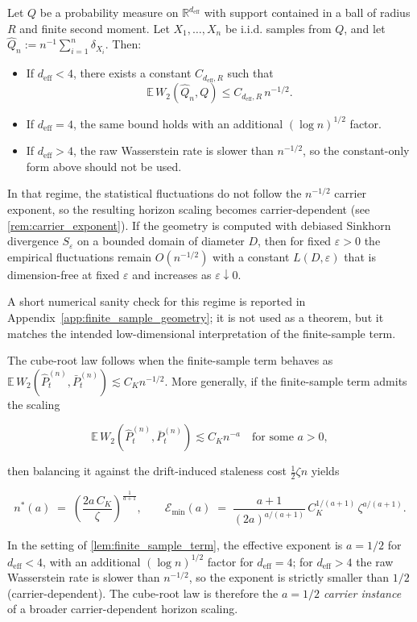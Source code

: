 \begin{lemma}\label{lem:finite_sample_term}
Let $Q$ be a probability measure on $\mathbb R^{d_\mathrm{eff}}$ with support
contained in a ball of radius $R$ and finite second moment. Let
$X_1,\dots,X_n$ be i.i.d. samples from $Q$, and let
$\hat Q_n := n^{-1}\sum_{i=1}^n \delta_{X_i}$. Then:
\begin{itemize}
  \item If $d_\mathrm{eff}<4$, there exists a constant $C_{d_\mathrm{eff},R}$
  such that
  \[
    \mathbb E\,W_2(\hat Q_n,Q) \le C_{d_\mathrm{eff},R}\,n^{-1/2}.
  \]
  \item If $d_\mathrm{eff}=4$, the same bound holds with an additional
  $(\log n)^{1/2}$ factor.
	\item If $d_\mathrm{eff}>4$, the raw Wasserstein rate is slower than
	$n^{-1/2}$, so the constant-only form above should not be used.
	\end{itemize}

	In that regime, the statistical fluctuations do not follow the
	$n^{-1/2}$ carrier exponent, so the resulting horizon scaling becomes
	carrier-dependent (see \cref{rem:carrier_exponent}).
If the geometry is computed with debiased Sinkhorn divergence $S_\varepsilon$
on a bounded domain of diameter $D$, then for fixed $\varepsilon>0$ the
empirical fluctuations remain $O(n^{-1/2})$ with a constant
$L(D,\varepsilon)$ that is dimension-free at fixed $\varepsilon$ and increases
as $\varepsilon\downarrow 0$.

A short numerical sanity check for this regime is reported in
Appendix~\ref{app:finite_sample_geometry}; it is not used as a theorem, but it
matches the intended low-dimensional interpretation of the finite-sample term.
\end{lemma}

\begin{remark}\label{rem:carrier_exponent}
The cube-root law follows when the finite-sample term behaves as
\(\mathbb E\,W_2(\widehat P_t^{(n)},\bar P_t^{(n)})\lesssim C_K n^{-1/2}\).
More generally, if the finite-sample term admits the scaling

\[
  \mathbb E\,W_2(\widehat P_t^{(n)},\bar P_t^{(n)})\lesssim C_K n^{-a}
  \quad\text{for some }a>0,
\]

then balancing it against the drift-induced staleness cost
\(\tfrac12\zeta n\) yields

\[
  n^*(a)
  \;=\;\left(\frac{2a\,C_K}{\zeta}\right)^{\!\frac{1}{a+1}},
  \qquad
  \mathcal E_{\min}(a)
  \;=\;\frac{a+1}{(2a)^{a/(a+1)}}\,C_K^{1/(a+1)}\,\zeta^{a/(a+1)}.
\]

In the setting of \cref{lem:finite_sample_term}, the effective exponent is
\(a=1/2\) for \(d_\mathrm{eff}<4\), with an additional \((\log n)^{1/2}\)
factor for \(d_\mathrm{eff}=4\); for \(d_\mathrm{eff}>4\) the raw Wasserstein
rate is slower than \(n^{-1/2}\), so the exponent is strictly smaller than
\(1/2\) (carrier-dependent). The cube-root law is therefore the
\emph{$a=1/2$ carrier instance} of a broader carrier-dependent horizon
scaling.
\end{remark}

